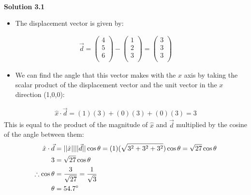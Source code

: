 \begin{framed}
\textbf{Solution 3.1}\\
\begin{itemize}
\item The displacement vector is given by:
\end{itemize}
\begin{align*}
\vec d = \begin{pmatrix}
           4\\
           5\\
           6\\
         \end{pmatrix} - \begin{pmatrix}
           1\\
           2\\
           3\\
         \end{pmatrix}=\begin{pmatrix}
           3\\
           3\\
           3\\
         \end{pmatrix}
\end{align*}
\begin{itemize}
\item We can find the angle that this vector makes with the $x$ axis by taking the scalar product of the displacement vector and the unit vector in the $x$ direction (1,0,0):
\end{itemize}
\begin{align*}
\hat x \cdot \vec d = (1)(3)+(0)(3)+(0)(3) = 3
\end{align*}
This is equal to the product of the magnitude of $\hat x$ and $\vec d$ multiplied by the cosine of the angle between them:
\begin{align*}
\hat x \cdot \vec d  &= ||\hat x||||\vec d||\cos\theta = (1)(\sqrt{3^2+3^2+3^2})\cos\theta= \sqrt{27}\cos\theta\\
 3 &= \sqrt{27}\cos\theta\\
 \therefore \cos\theta &= \frac{3}{\sqrt{27}} = \frac{1}{\sqrt{3}}\\
 \theta&= 54.7\text{\degree}
\end{align*}
\end{framed}